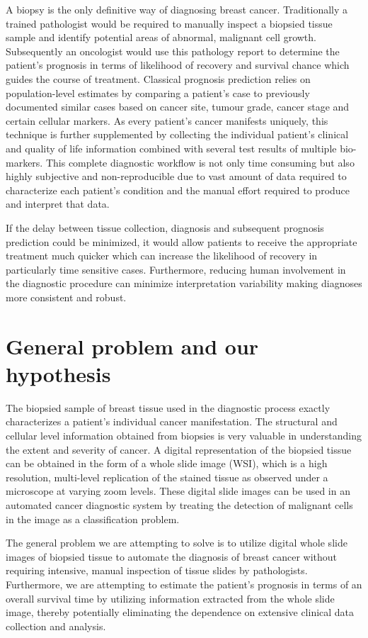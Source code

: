 \documentclass{l4proj}
\begin{document}
A biopsy is the only definitive way of diagnosing breast cancer. Traditionally a trained pathologist would be required to manually inspect a biopsied tissue sample and identify potential areas of abnormal, malignant cell growth. Subsequently an oncologist would use this pathology report to determine the patient's prognosis in terms of likelihood of recovery and survival chance which guides the course of treatment. Classical prognosis prediction  relies on population-level estimates by comparing a patient's case to previously documented similar cases based on cancer site, tumour grade, cancer stage and certain cellular markers. As every patient's cancer manifests uniquely, this technique is further supplemented by collecting the individual patient's clinical and quality of life information combined with several test results of multiple bio-markers. This complete diagnostic workflow is not only time consuming but also highly subjective and non-reproducible due to vast amount of data required to characterize each patient's condition and the manual effort required to produce and interpret that data.

If the delay between tissue collection, diagnosis and subsequent prognosis prediction could be minimized, it would allow patients to receive the appropriate treatment much quicker which can increase the likelihood of recovery in particularly time sensitive cases. Furthermore, reducing human involvement in the diagnostic procedure can minimize interpretation variability making diagnoses more consistent and robust.


\section{General problem and our hypothesis}
The biopsied sample of breast tissue used in the diagnostic process exactly characterizes a patient's individual cancer manifestation. The structural and cellular level information obtained from biopsies is very valuable in understanding the extent and severity of cancer. A digital representation of the biopsied tissue can be obtained in the form of a whole slide image (WSI), which is a high resolution, multi-level replication of the stained tissue as observed under a microscope at varying zoom levels. These digital slide images can be used in an automated cancer diagnostic system by treating the detection of malignant cells in the image as a classification problem. 

The general problem we are attempting to solve is to utilize digital whole slide images of biopsied tissue to automate the diagnosis of breast cancer without requiring intensive, manual inspection of tissue slides by pathologists. Furthermore, we are attempting to estimate the patient's prognosis in terms of an overall survival time by utilizing information extracted from the whole slide image, thereby potentially eliminating the dependence on extensive clinical data collection and analysis. 
\end{document}
